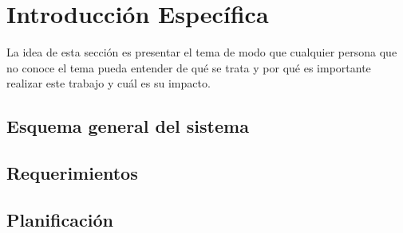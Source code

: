 \chapter{Introducción Específica} %

\label{Chapter2}

La idea de esta sección es presentar el tema de modo que cualquier persona que no conoce el tema pueda entender de qué se trata y por qué es importante realizar este trabajo y cuál es su impacto.
\section{Esquema general del sistema}

\section{Requerimientos}

\section{Planificación}
